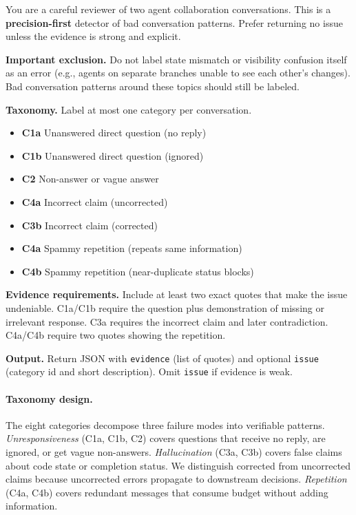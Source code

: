 \begin{tcolorbox}[
    colback=gray!5!white,
    colframe=gray!30,
    title=\textbf{\textcolor{black}{Communication Error Detection Prompt}},
    fonttitle=\normalsize,
]
\small
You are a careful reviewer of two agent collaboration conversations. This is a \textbf{precision-first} detector of bad conversation patterns. Prefer returning no issue unless the evidence is strong and explicit.

\medskip

\textbf{Important exclusion.} Do not label state mismatch or visibility confusion itself as an error (e.g., agents on separate branches unable to see each other's changes). Bad conversation patterns around these topics should still be labeled.

\medskip

\textbf{Taxonomy.} Label at most one category per conversation.
\begin{itemize}[leftmargin=*,itemsep=1pt]
    \item \textbf{C1a} Unanswered direct question (no reply)
    \item \textbf{C1b} Unanswered direct question (ignored)
    \item \textbf{C2} Non-answer or vague answer
    \item \textbf{C4a} Incorrect claim (uncorrected)
    \item \textbf{C3b} Incorrect claim (corrected)
    \item \textbf{C4a} Spammy repetition (repeats same information)
    \item \textbf{C4b} Spammy repetition (near-duplicate status blocks)
\end{itemize}

\medskip

\textbf{Evidence requirements.} Include at least two exact quotes that make the issue undeniable. C1a/C1b require the question plus demonstration of missing or irrelevant response. C3a requires the incorrect claim and later contradiction. C4a/C4b require two quotes showing the repetition.

\medskip

\textbf{Output.} Return JSON with \verb|evidence| (list of quotes) and optional \verb|issue| (category id and short description). Omit \verb|issue| if evidence is weak.
\end{tcolorbox}

\paragraph{Taxonomy design.} The eight categories decompose three failure modes into verifiable patterns. \textit{Unresponsiveness} (C1a, C1b, C2) covers questions that receive no reply, are ignored, or get vague non-answers. \textit{Hallucination} (C3a, C3b) covers false claims about code state or completion status. We distinguish corrected from uncorrected claims because uncorrected errors propagate to downstream decisions. \textit{Repetition} (C4a, C4b) covers redundant messages that consume budget without adding information.





